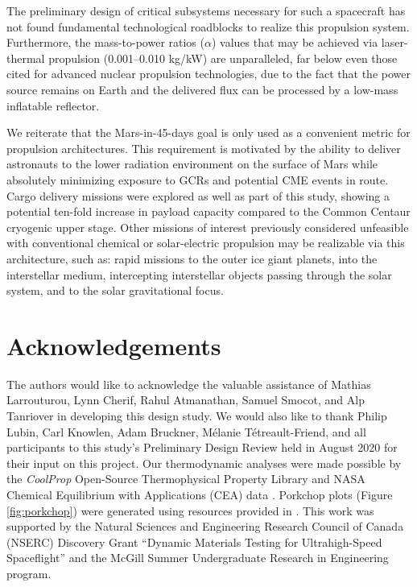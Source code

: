 \documentclass[final,3p,times,twocolumn,sort&compress, lefttitle]{elsarticle}
\begin{document}
        The preliminary design of critical subsystems necessary for such a spacecraft has not found fundamental technological roadblocks to realize this propulsion system. Furthermore, the mass-to-power ratios ($\alpha$) values that may be achieved via laser-thermal propulsion (0.001--0.010 kg/kW) are unparalleled, far below even those cited for advanced nuclear propulsion technologies, due to the fact that the power source remains on Earth and the delivered flux can be processed by a low-mass inflatable reflector.
        
        We reiterate that the Mars-in-45-days goal is only used as a convenient metric for propulsion architectures. This requirement is motivated by the ability to deliver astronauts to the lower radiation environment on the surface of Mars while absolutely minimizing exposure to GCRs and potential CME events in route. Cargo delivery missions were explored as well as part of this study, showing a potential ten-fold increase in payload capacity compared to the Common Centaur cryogenic upper stage. Other missions of interest previously considered unfeasible with conventional chemical or solar-electric propulsion may be realizable via this architecture, such as: rapid missions to the outer ice giant planets, into the interstellar medium, intercepting interstellar objects passing through the solar system, and to the solar gravitational focus.
    
    \section{Acknowledgements}
        The authors would like to acknowledge the valuable assistance of Mathias Larrouturou, Lynn Cherif, Rahul Atmanathan, Samuel Smocot, and Alp Tanriover in developing this design study. We would also like to thank Philip Lubin, Carl Knowlen, Adam Bruckner, Mélanie Tétreault-Friend, and all participants to this study's Preliminary Design Review held in August 2020 for their input on this project. Our thermodynamic analyses were made possible by the \emph{CoolProp} Open-Source Thermophysical Property Library \cite{bell_pure_2014} and NASA Chemical Equilibrium with Applications (CEA) data \cite{mcbride_nasa_2002}. Porkchop plots (Figure \ref{fig:porkchop}) were generated using resources provided in \cite{yaylali_david_2019}. This work was supported by the Natural Sciences and Engineering Research Council of Canada (NSERC) Discovery Grant “Dynamic Materials Testing for Ultrahigh-Speed Spaceflight” and the McGill Summer Undergraduate Research in Engineering program.
\end{document}
